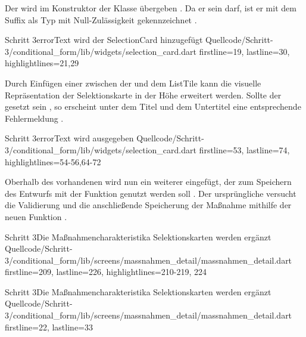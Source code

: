 Der  wird im Konstruktor der Klasse  übergeben .
Da er  sein darf, ist er mit dem Suffix  als Typ mit Null-Zulässigkeit gekennzeichnet . 

\begin{alexlisting}{Schritt 3}{errorText wird der SelectionCard hinzugefügt}
    {Quellcode/Schritt-3/conditional_form/lib/widgets/selection_card.dart}
    {firstline=19, lastline=30, highlightlines={21,29}}
    \label{lst:Schritt3errorText}
\end{alexlisting}

Durch Einfügen einer  zwischen der   und dem ListTile  kann die visuelle Repräsentation der Selektionskarte in der Höhe erweitert werden.
Sollte der  gesetzt sein , so erscheint unter dem Titel und dem Untertitel eine entsprechende Fehlermeldung .
 

\begin{alexlisting}{Schritt 3}{errorText wird ausgegeben}
    {Quellcode/Schritt-3/conditional_form/lib/widgets/selection_card.dart}
    {firstline=53, lastline=74, highlightlines={54-56,64-72}}
    \label{lst:Schritt3ColumnErrorText}
\end{alexlisting}



Oberhalb des vorhandenen  wird nun ein weiterer eingefügt, der zum Speichern des Entwurfs mit der Funktion  genutzt werden soll . Der ursprüngliche  versucht die Validierung und die anschließende Speicherung der Maßnahme mithilfe der neuen Funktion  .

\begin{alexlisting}{Schritt 3}{Die Maßnahmencharakteristika Selektionskarten werden ergänzt}
    {Quellcode/Schritt-3/conditional_form/lib/screens/massnahmen_detail/massnahmen_detail.dart}
    {firstline=209, lastline=226, highlightlines={210-219, 224}}
    \label{lst:Schritt3FloatingActionButton}
\end{alexlisting}




\begin{alexlisting}{Schritt 3}{Die Maßnahmencharakteristika Selektionskarten werden ergänzt}
    {Quellcode/Schritt-3/conditional_form/lib/screens/massnahmen_detail/massnahmen_detail.dart}
    {firstline=22, lastline=33}
    \label{lst:Schritt3DieMassnahmencharakteristikaSelektionskartenWerdenergaenzt}
\end{alexlisting}


